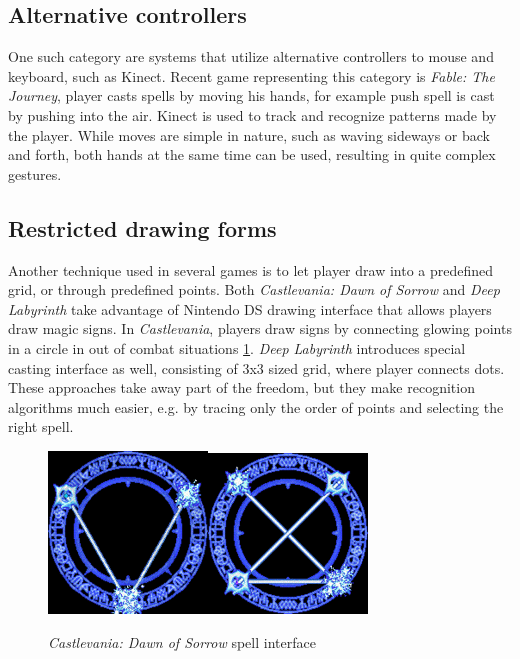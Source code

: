 \subsection{Alternative controllers}
One such category are systems that utilize alternative controllers to mouse and keyboard, such as Kinect. Recent game representing this category is \emph{Fable: The Journey}, player casts spells by moving his hands, for example push spell is cast by pushing into the air. Kinect is used to track and recognize patterns made by the player. While moves are simple in nature, such as waving sideways or back and forth, both hands at the same time can be used, resulting in quite complex gestures.

\subsection{Restricted drawing forms}
Another technique used in several games is to let player draw into a predefined grid, or through predefined points. Both \emph{Castlevania: Dawn of Sorrow} and \emph{Deep Labyrinth} take advantage of Nintendo DS drawing interface that allows players draw magic signs. In \emph{Castlevania}, players draw signs by connecting glowing points in a circle in out of combat situations \ref{fig:castlevania}. \emph{Deep Labyrinth} introduces special casting interface as well, consisting of 3x3 sized grid, where player connects dots. These approaches take away part of the freedom, but they make recognition algorithms much easier, e.g. by tracing only the order of points and selecting the right spell.

\begin{figure}[!htb]
\begin{center}
\label{fig:castlevania}
\includegraphics[width=.3\linewidth]{ext/castlevania.png}\quad\includegraphics[width=.3\linewidth]{ext/castlevania2.png}
\end{center}
	\centering
	\caption{\emph{Castlevania: Dawn of Sorrow} spell interface}
\end{figure}

